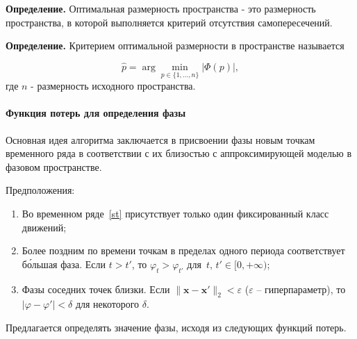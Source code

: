\documentclass[12pt, twoside]{article}
\theoremstyle{definition}
\def\eps{\varepsilon}
\begin{document}

\textbf{Определение.}
Оптимальная размерность пространства - это размерность пространства, в которой выполняется критерий отсутствия самопересечений.

\textbf{Определение.}
Критерием оптимальной размерности в пространстве называется

\begin{equation}           
    \hat{p} = \arg\min_{p \in \{1, \dots, n \}} |\Phi(p)|,
\label{eq:intersection_criterion} 
\end{equation}
где $n$ - размерность исходного пространства.\\


\paragraph{Функция потерь для определения фазы} \label{subsection:4.3}

Основная идея алгоритма заключается в присвоении фазы новым точкам временного ряда в соответствии с их близостью с аппроксимирующей моделью в фазовом пространстве.  

Предположения:
\begin{enumerate}
    \item Во временном ряде~\eqref{st} присутствует только один фиксированный класс движений; 
    
    \item \label{enum:2} Более поздним по времени точкам в пределах одного периода соответствует б\'{о}льшая фаза.  
    Если $t > t'$, то $\varphi_t > \varphi_{t'}$ для~$t,\, t' \in [0,+\infty)$;
    
    \item \label{enum:3} Фазы соседних точек близки. Если $\| \mathbf{x} - \mathbf{x}' \|_2 < \eps$ ($\eps$ -- гиперпараметр), то $| \varphi - \varphi'|<\delta$ для некоторого $\delta$.
\end{enumerate}

Предлагается определять значение фазы, исходя из следующих функций потерь.
\end{document}
